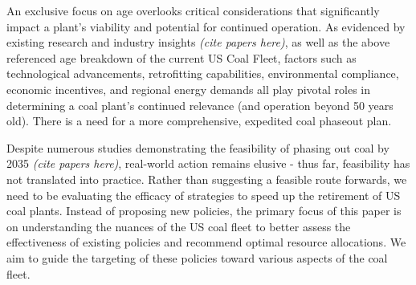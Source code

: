 An exclusive focus on age overlooks critical considerations that significantly impact a plant's viability and potential for continued operation. 
As evidenced by existing research and industry insights \textit{(cite papers here)}, as well as the above referenced age breakdown of the current US Coal Fleet,
factors such as technological advancements, retrofitting capabilities, environmental compliance, economic incentives, and regional energy demands all play pivotal roles in determining a coal plant's continued relevance (and operation beyond 50 years old).
There is a need for a more comprehensive, expedited coal phaseout plan. 

Despite numerous studies demonstrating the feasibility of phasing out coal by 2035 \textit{(cite papers here)}, 
real-world action remains elusive - thus far, feasibility has not translated into practice. 
Rather than suggesting a feasible route forwards, we need to be evaluating the efficacy of strategies to speed up the retirement of US coal plants. 
Instead of proposing new policies, the primary focus of this paper is on understanding the nuances of the US coal fleet to better assess the effectiveness 
of existing policies and recommend optimal resource allocations. We aim to guide the targeting of these policies toward various aspects of the coal fleet.



